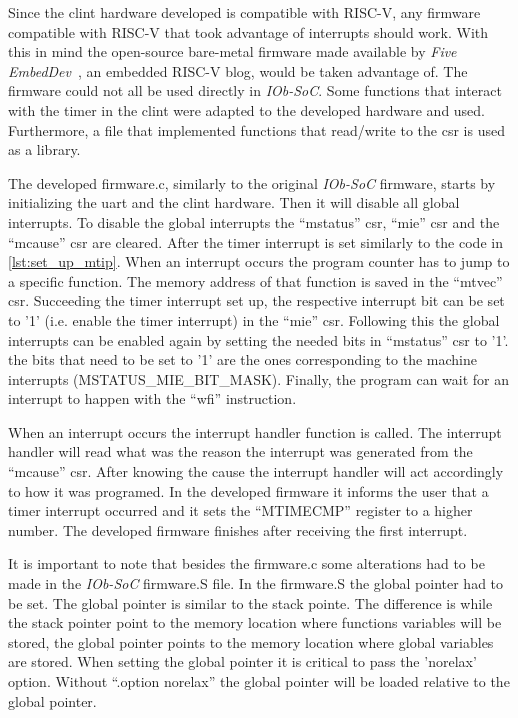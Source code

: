 Since the \acrshort{clint} hardware developed is compatible with RISC-V, any firmware compatible with RISC-V that took advantage of interrupts should work. With this in mind the open-source bare-metal firmware made available by \textit{Five EmbedDev}~\cite{bare_metal_int}, an embedded RISC-V blog, would be taken advantage of. The firmware could not all be used directly in \textit{IOb-SoC}. Some functions that interact with the timer in the \acrshort{clint} were adapted to the developed hardware and used. Furthermore, a file that implemented functions that read/write to the \acrlong{csr} is used as a library. 

The developed firmware.c, similarly to the original \textit{IOb-SoC} firmware, starts by initializing the \acrshort{uart} and the \acrshort{clint} hardware. Then it will disable all global interrupts. To disable the global interrupts the \enquote{mstatus} \acrshort{csr}, \enquote{mie} \acrshort{csr} and the \enquote{mcause} \acrshort{csr} are cleared. After the timer interrupt is set similarly to the code in \ref{lst:set_up_mtip}. When an interrupt occurs the program counter has to jump to a specific function. The memory address of that function is saved in the \enquote{mtvec} \acrshort{csr}. Succeeding the timer interrupt set up, the respective interrupt bit can be set to '1' (i.e. enable the timer interrupt) in the \enquote{mie} \acrshort{csr}. Following this the global interrupts can be enabled again by setting the needed bits in \enquote{mstatus} \acrshort{csr} to '1'. the bits that need to be set to '1' are the ones corresponding to the machine interrupts (MSTATUS\_MIE\_BIT\_MASK). Finally, the program can wait for an interrupt to happen with the \enquote{wfi} instruction.

When an interrupt occurs the interrupt handler function is called. The interrupt handler will read what was the reason the interrupt was generated from the \enquote{mcause} \acrshort{csr}. After knowing the cause the interrupt handler will act accordingly to how it was programed. In the developed firmware it informs the user that a timer interrupt occurred and it sets the \enquote{MTIMECMP} register to a higher number. The developed firmware finishes after receiving the first interrupt.

It is important to note that besides the firmware.c some alterations had to be made in the \textit{IOb-SoC} firmware.S file. In the firmware.S the global pointer had to be set. The global pointer is similar to the stack pointe. The difference is while the stack pointer point to the memory location where functions variables will be stored, the global pointer points to the memory location where global variables are stored. When setting the global pointer it is critical to pass the 'norelax' option. Without \enquote{.option norelax} the global pointer will be loaded relative to the global pointer.

